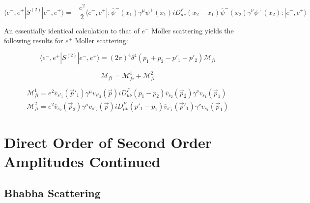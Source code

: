 \documentclass[a4]{article}
\begin{document}
        \begin{framed}

            \begin{equation}
                \langle e^{-}, e^{+} | S^{(2)} | e^{-}, e^{+} \rangle = - \frac{e^2}{2} \langle e^{-}, e^{+} | :\overline{\psi}^{-} (x_1) \gamma^{\mu} \psi^{+} (x_1) i D^{F}_{\mu \nu} (x_2 - x_1) \overline{\psi}^{-} (x_2) \gamma^{\nu} \psi^{+} (x_2): | e^{-}, e^{+} \rangle 
            \end{equation}

            An essentially identical calculation to that of $e^{-}$ Moller scattering yields the following results for $e^{+}$ Moller scattering:
            
            \begin{equation}
                \langle e^{-}, e^{+} | S^{(2)} | e^{-}, e^{+} \rangle = (2 \pi)^4 \delta^4 (p_1 + p_2 - p'_1 - p'_2) \mathcal{M}_{fi}
            \end{equation}

            \begin{equation}
                \mathcal{M}_{fi} = \mathcal{M}_{fi}^{1} + \mathcal{M}_{fi}^{2}
            \end{equation}

            \begin{equation}
                \begin{aligned}
                    \mathcal{M}_{fi}^{1} = e^2 \overline{v}_{s'_1} (\vec{p}'_1) \gamma^{\mu} v_{s'_2} (\vec{p}) i D_{\mu \nu}^{F} (p_1 - p_2) \overline{v}_{s_2} (\vec{p}_2) \gamma^{\nu} v_{s_1} (\vec{p}_1) \\
                    \mathcal{M}_{fi}^{2} = e^2 \overline{v}_{s_2} (\vec{p}_2) \gamma^{\mu} v_{s'_2} (\vec{p}) i D_{\mu \nu}^{F} (p'_1 - p_1) \overline{v}_{s'_1} (\vec{p}'_1) \gamma^{\nu} v_{s_1} (\vec{p}_1)
                \end{aligned}
            \end{equation}

        \end{framed}

    \section{Direct Order of Second Order Amplitudes Continued}

        \subsection{Bhabha Scattering}
\end{document}
